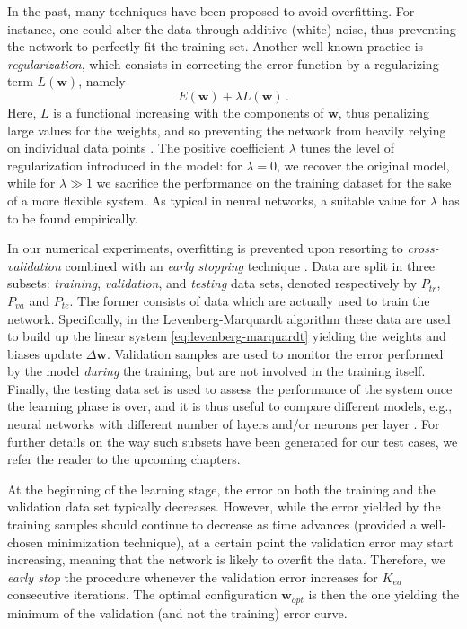 \documentclass[12pt, a4paper, twoside, openright, notitlepage]{report}
\numberwithin{equation}{chapter}
\theoremstyle{theorem}
\theoremstyle{definition}
\theoremstyle{remark}
\theoremstyle{proposition}
\numberwithin{figure}{chapter}
\begin{document}
		In the past, many techniques have been proposed to avoid overfitting. For instance, one could alter the data through additive (white) noise, thus preventing the network to perfectly fit the training set. Another well-known practice is \emph{regularization}, which consists in correcting the error function by a regularizing term $L(\mathbf{w})$, namely
		\begin{equation*}
			E(\mathbf{w}) + \lambda L(\mathbf{w}) \, .
		\end{equation*}
		Here, $L$ is a functional increasing with the components of $\mathbf{w}$, thus penalizing large values for the weights, and so preventing the network from heavily relying on individual data points \cite{Mat16}. The positive coefficient $\lambda$ tunes the level of regularization introduced in the model: for $\lambda = 0$, we recover the original model, while for $\lambda \gg 1$ we sacrifice the performance on the training dataset for the sake of a more flexible system. As typical in neural networks, a suitable value for $\lambda$ has to be found empirically. 
		
		In our numerical experiments, overfitting is prevented upon resorting to \emph{cross-validation} combined with an \emph{early stopping} technique \cite{Koh95}. Data are split in three subsets: \emph{training}, \emph{validation}, and \emph{testing} data sets, denoted respectively by $P_{tr}$, $P_{va}$ and $P_{te}$. The former consists of data which are actually used to train the network. Specifically, in the Levenberg-Marquardt algorithm these data are used to build up the linear system \eqref{eq:levenberg-marquardt} yielding the weights and biases update $\Delta \mathbf{w}$. Validation samples are used to monitor the error performed by the model \emph{during} the training, but are not involved in the training itself. Finally, the testing data set is used to assess the performance of the system once the learning phase is over, and it is thus useful to compare different models, e.g., neural networks with different number of layers and/or neurons per layer \cite{Mat16}. For further details on the way such subsets have been generated for our test cases, we refer the reader to the upcoming chapters.
		
		At the beginning of the learning stage, the error on both the training and the validation data set typically decreases. However, while the error yielded by the training samples should continue to decrease as time advances (provided a well-chosen minimization technique), at a certain point the validation error may start increasing, meaning that the network is likely to overfit the data. Therefore, we \emph{early stop} the procedure whenever the validation error increases for $K_{ea}$ consecutive iterations. The optimal configuration $\mathbf{w}_{opt}$ is then the one yielding the minimum of the validation (and not the training) error curve.
		
\end{document}
